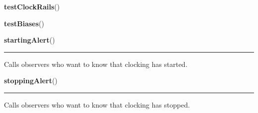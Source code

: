     \label{dsp:testClockRails}

    \vspace{0.5ex}

    \begin{boxedminipage}{\textwidth}

    \raggedright \textbf{testClockRails}()

    \end{boxedminipage}

    \label{dsp:testBiases}

    \vspace{0.5ex}

    \begin{boxedminipage}{\textwidth}

    \raggedright \textbf{testBiases}()

    \end{boxedminipage}

    \label{dsp:startingAlert}

    \vspace{0.5ex}

    \begin{boxedminipage}{\textwidth}

    \raggedright \textbf{startingAlert}()

    \vspace{-1.5ex}

    \rule{\textwidth}{0.5\fboxrule}
    Calls observers who want to know that clocking has started.

    \vspace{1ex}

    \end{boxedminipage}

    \label{dsp:stoppingAlert}

    \vspace{0.5ex}

    \begin{boxedminipage}{\textwidth}

    \raggedright \textbf{stoppingAlert}()

    \vspace{-1.5ex}

    \rule{\textwidth}{0.5\fboxrule}
    Calls observers who want to know that clocking has stopped.

    \vspace{1ex}

    \end{boxedminipage}

